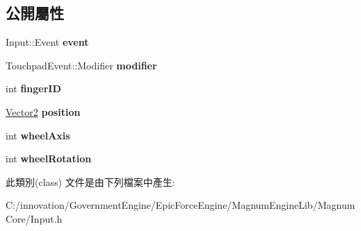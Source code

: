 \subsection*{公開屬性}
\begin{DoxyCompactItemize}
\item 
Input\+::\+Event {\bfseries event}\hypertarget{class_i_dream_sky_1_1_input_1_1_touchpad_event_a8b1f898ad5205cab7279d3ceeeb9e427}{}\label{class_i_dream_sky_1_1_input_1_1_touchpad_event_a8b1f898ad5205cab7279d3ceeeb9e427}

\item 
Touchpad\+Event\+::\+Modifier {\bfseries modifier}\hypertarget{class_i_dream_sky_1_1_input_1_1_touchpad_event_aae5194da33de7fa5205d37b5945224ca}{}\label{class_i_dream_sky_1_1_input_1_1_touchpad_event_aae5194da33de7fa5205d37b5945224ca}

\item 
int {\bfseries finger\+ID}\hypertarget{class_i_dream_sky_1_1_input_1_1_touchpad_event_a3ffe979836cc46a3679cd6af829fbdfe}{}\label{class_i_dream_sky_1_1_input_1_1_touchpad_event_a3ffe979836cc46a3679cd6af829fbdfe}

\item 
\hyperlink{class_i_dream_sky_1_1_vector2}{Vector2} {\bfseries position}\hypertarget{class_i_dream_sky_1_1_input_1_1_touchpad_event_a029ca8c61780f808ed4987c2293dff51}{}\label{class_i_dream_sky_1_1_input_1_1_touchpad_event_a029ca8c61780f808ed4987c2293dff51}

\item 
int {\bfseries wheel\+Axis}\hypertarget{class_i_dream_sky_1_1_input_1_1_touchpad_event_a4c34dfc322c8c7c2f510866efd767c86}{}\label{class_i_dream_sky_1_1_input_1_1_touchpad_event_a4c34dfc322c8c7c2f510866efd767c86}

\item 
int {\bfseries wheel\+Rotation}\hypertarget{class_i_dream_sky_1_1_input_1_1_touchpad_event_af017565d02dc4b97cd8f91260038501c}{}\label{class_i_dream_sky_1_1_input_1_1_touchpad_event_af017565d02dc4b97cd8f91260038501c}

\end{DoxyCompactItemize}


此類別(class) 文件是由下列檔案中產生\+:\begin{DoxyCompactItemize}
\item 
C\+:/innovation/\+Government\+Engine/\+Epic\+Force\+Engine/\+Magnum\+Engine\+Lib/\+Magnum\+Core/Input.\+h\end{DoxyCompactItemize}

